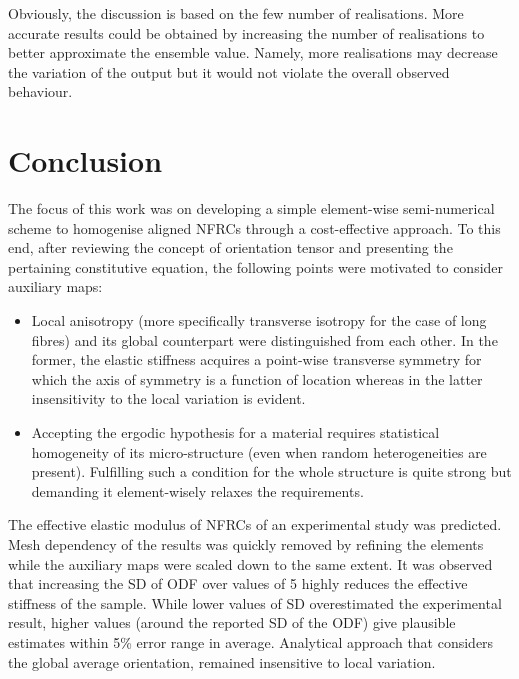 	Obviously, the discussion is based on the few number of realisations. More accurate results could be obtained by increasing the number of realisations to better approximate the ensemble value. Namely, more realisations may decrease the variation of the output but it would not violate the overall observed behaviour.
	


\section{Conclusion}	
	The focus of this work was on developing a simple element-wise semi-numerical scheme to homogenise aligned NFRCs through a cost-effective approach. To this end, after reviewing the concept of orientation tensor and presenting the pertaining constitutive equation, the following points were motivated to consider auxiliary maps:
	\begin{itemize}
		\item Local anisotropy (more specifically transverse isotropy for the case of long fibres) and its global counterpart were distinguished from each other. In the former, the elastic stiffness acquires a point-wise transverse symmetry for which the axis of symmetry is a function of location whereas in the latter insensitivity to the local variation is evident.
		\item Accepting the ergodic hypothesis for a material requires statistical homogeneity of its micro-structure (even when random heterogeneities are present). Fulfilling such a condition for the whole structure is quite strong but demanding it element-wisely relaxes the requirements.
	\end{itemize}
	The effective elastic modulus of NFRCs of an experimental study was predicted. Mesh dependency of the results was quickly removed by refining the elements while the auxiliary maps were scaled down to the same extent. It was observed that increasing the SD of ODF over values of 5 highly reduces the effective stiffness of the sample. While lower values of SD overestimated the experimental result, higher values (around the reported SD of the ODF) give plausible estimates within 5\% error range in average. Analytical approach that considers the global average orientation, remained insensitive to local variation.
		
